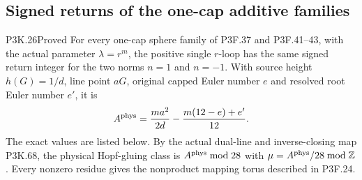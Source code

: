 \subsection{Signed returns of the one-cap additive families}

\begin{statement}{P3K.26}{Proved}
For every one-cap sphere family of P3F.37 and P3F.41--43, with the actual parameter $\lambda=r^m$, the positive single $r$-loop has the same signed return integer for the two norms $n=1$ and $n=-1$. With source height $h(G)=1/d$, line point $aG$, original capped Euler number $e$ and resolved root Euler number $e'$, it is
\[
A^{\rm phys}=\frac{ma^2}{2d}-\frac{m(12-e)+e'}{12}.
\]
The exact values are listed below. By the actual dual-line and inverse-closing map P3K.68, the physical Hopf-gluing class is $A^{\rm phys}\bmod28$ with $\mu=A^{\rm phys}/28\bmod\mathbb Z$. Every nonzero residue gives the nonproduct mapping torus described in P3F.24.
\end{statement}
